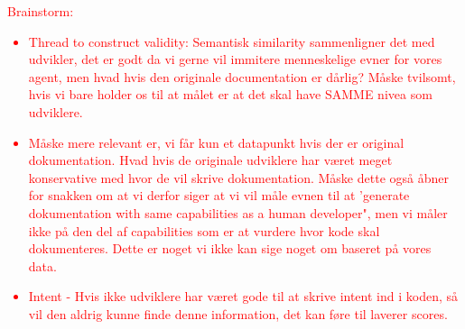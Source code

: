 \textcolor{red}{Brainstorm: \begin{itemize}
    \item Thread to construct validity: Semantisk similarity sammenligner det med udvikler, det er godt da vi gerne vil immitere menneskelige evner for vores agent, men hvad hvis den originale documentation er dårlig? Måske tvilsomt, hvis vi bare holder os til at målet er at det skal have SAMME nivea som udviklere.
    \item Måske mere relevant er, vi får kun et datapunkt hvis der er original dokumentation. Hvad hvis de originale udviklere har været meget konservative med hvor de vil skrive dokumentation. Måske dette også åbner for snakken om at vi derfor siger at vi vil måle evnen til at 'generate dokumentation with same capabilities as a human developer", men vi måler ikke på den del af capabilities som er at vurdere hvor kode skal dokumenteres. Dette er noget vi ikke kan sige noget om baseret på vores data.
    \item Intent - Hvis ikke udviklere har været gode til at skrive intent ind i koden, så vil den aldrig kunne finde denne information, det kan føre til laverer scores.
\end{itemize}}